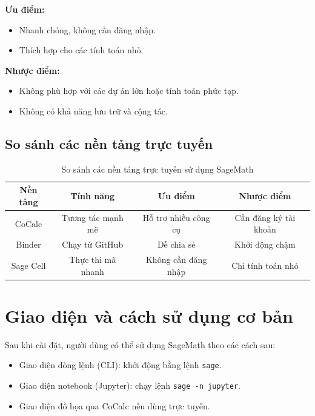 \textbf{Ưu điểm:}
\begin{itemize}
	\item Nhanh chóng, không cần đăng nhập.
	\item Thích hợp cho các tính toán nhỏ.
\end{itemize}

\textbf{Nhược điểm:}
\begin{itemize}
	\item Không phù hợp với các dự án lớn hoặc tính toán phức tạp.
	\item Không có khả năng lưu trữ và cộng tác.
\end{itemize}

\subsection{So sánh các nền tảng trực tuyến}

\begin{table}[H]
	\centering
	\begin{tabular}{|c|c|c|c|}
		\hline
		\textbf{Nền tảng} & \textbf{Tính năng} & \textbf{Ưu điểm} & \textbf{Nhược điểm} \\
		\hline
		CoCalc & Tương tác mạnh mẽ & Hỗ trợ nhiều công cụ & Cần đăng ký tài khoản \\
		\hline
		Binder & Chạy từ GitHub & Dễ chia sẻ & Khởi động chậm \\
		\hline
		Sage Cell & Thực thi mã nhanh & Không cần đăng nhập & Chỉ tính toán nhỏ \\
		\hline
	\end{tabular}
	\caption{So sánh các nền tảng trực tuyến sử dụng SageMath}
\end{table}

\section{Giao diện và cách sử dụng cơ bản}

Sau khi cài đặt, người dùng có thể sử dụng SageMath theo các cách sau:

\begin{itemize}
	\item Giao diện dòng lệnh (CLI): khởi động bằng lệnh \texttt{sage}.
	\item Giao diện notebook (Jupyter): chạy lệnh \texttt{sage -n jupyter}.
	\item Giao diện đồ họa qua CoCalc nếu dùng trực tuyến.
\end{itemize}

